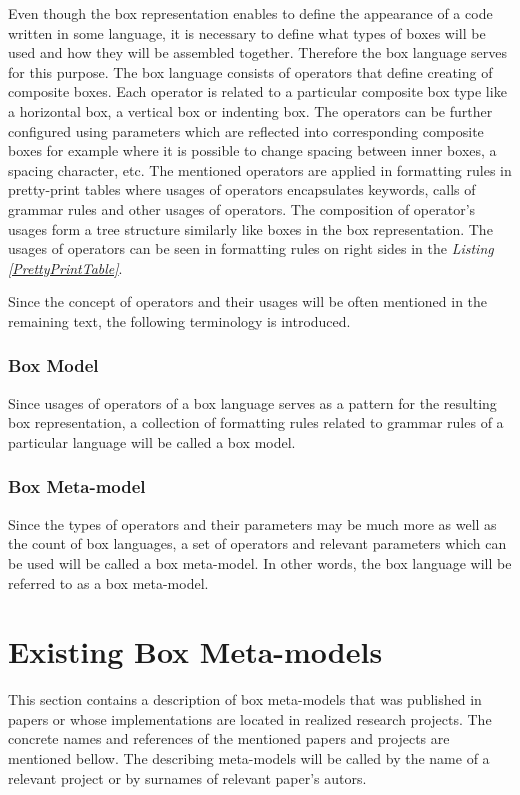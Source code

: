\documentclass[12pt,notitlepage,a4paper]{report}
\begin{document}
Even though the box representation enables to define the appearance of a code written in some language, it is necessary to define what types of boxes will be used and how they will be assembled together. Therefore the box language serves for this purpose. The box language consists of operators that define creating of composite boxes. Each operator is related to a particular composite box type like a horizontal box, a vertical box or indenting box. The operators can be further configured using parameters which are reflected into corresponding composite boxes for example where it is possible to change spacing between inner boxes, a spacing character, etc. The mentioned operators are applied in formatting rules in pretty-print tables where usages of operators encapsulates keywords, calls of grammar rules and other usages of operators. The composition of operator's usages form a tree structure similarly like boxes in the box representation. The usages of operators can be seen in formatting rules on right sides in the \textit{Listing \ref{PrettyPrintTable}}. 

Since the concept of operators and their usages will be often mentioned in the remaining text, the following terminology is introduced.

\subsubsection {Box Model}

Since usages of operators of a box language serves as a pattern for the resulting box representation, a collection of formatting rules related to grammar rules of a particular language will be called a box model.

\subsubsection {Box Meta-model}

Since the types of operators and their parameters may be much more as well as the count of box languages, a set of operators and relevant parameters which can be used will be called a box meta-model. In other words, the box language will be referred to as a box meta-model.

\section {Existing Box Meta-models}
\label{ExistingBoxMetaModels}
This section contains a description of box meta-models that was published in papers or whose implementations are located in realized research projects. The concrete names and references of the mentioned papers and projects are mentioned bellow. The describing meta-models will be called by the name of a relevant project or by surnames of relevant paper's autors. 
\end{document}
